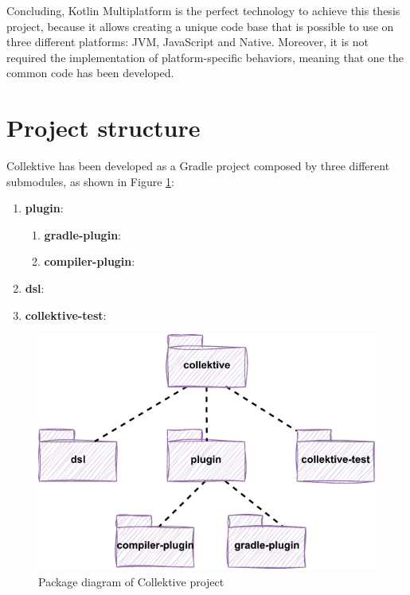 Concluding, Kotlin Multiplatform is the perfect technology to achieve this thesis project, because it allows creating a unique code base that is possible to use on three different platforms: JVM, JavaScript and Native. Moreover, it is not required the implementation of platform-specific behaviors, meaning that one the common code has been developed.

\section{Project structure}\label{section:project_structure}
Collektive has been developed as a Gradle project composed by three different submodules, as shown in Figure \ref{fig:collektive_package_diagram}:
\begin{enumerate}
    \item \textbf{plugin}:
    \begin{enumerate}
        \item \textbf{gradle-plugin}:
        \item \textbf{compiler-plugin}:
    \end{enumerate}
    \item \textbf{dsl}:
    \item \textbf{collektive-test}:
\end{enumerate}
\begin{figure}[!ht]
    \centering
    \includegraphics[scale=1.1]{document/chapters/4-collektive/images/collektive_package_diagram.pdf}
    \caption{Package diagram of Collektive project}
    \label{fig:collektive_package_diagram}
\end{figure}

